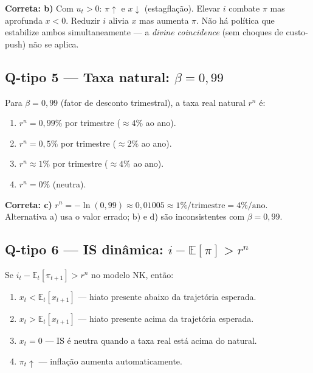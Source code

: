 \documentclass[12pt, a4paper]{article}
\newcommand{\E}{\mathbb{E}}
\begin{document}
\begin{resultbox}[title={Resposta Q-tipo 4: alternativa b)}]
\textbf{Correta: b)} Com $u_t > 0$: $\pi\uparrow$ e $x\downarrow$ (estagflação).
Elevar $i$ combate $\pi$ mas aprofunda $x<0$. Reduzir $i$ alivia $x$ mas aumenta $\pi$.
Não há política que estabilize ambos simultaneamente --- a \emph{divine coincidence}
(sem choques de custo-push) não se aplica.
\end{resultbox}

\bigskip

\subsection*{Q-tipo 5 --- Taxa natural: $\beta = 0{,}99$}

Para $\beta = 0{,}99$ (fator de desconto trimestral), a taxa real natural $r^n$ é:

\begin{enumerate}[label=\textbf{\alph*)}, leftmargin=2em, itemsep=4pt]
  \item $r^n = 0{,}99\%$ por trimestre ($\approx 4\%$ ao ano).
  \item $r^n = 0{,}5\%$ por trimestre ($\approx 2\%$ ao ano).
  \item $r^n \approx 1\%$ por trimestre ($\approx 4\%$ ao ano).
  \item $r^n = 0\%$ (neutra).
\end{enumerate}

\begin{resultbox}[title={Resposta Q-tipo 5: alternativa c)}]
\textbf{Correta: c)} $r^n = -\ln(0{,}99) \approx 0{,}01005 \approx 1\%/\text{trimestre}
= 4\%/\text{ano}$. Alternativa a) usa o valor errado; b) e d) são inconsistentes
com $\beta = 0{,}99$.
\end{resultbox}

\bigskip

\subsection*{Q-tipo 6 --- IS dinâmica: $i - \E[\pi] > r^n$}

Se $i_t - \E_t[\pi_{t+1}] > r^n$ no modelo NK, então:

\begin{enumerate}[label=\textbf{\alph*)}, leftmargin=2em, itemsep=4pt]
  \item $x_t < \E_t[x_{t+1}]$ --- hiato presente abaixo da trajetória esperada.
  \item $x_t > \E_t[x_{t+1}]$ --- hiato presente acima da trajetória esperada.
  \item $x_t = 0$ --- IS é neutra quando a taxa real está acima do natural.
  \item $\pi_t\uparrow$ --- inflação aumenta automaticamente.
\end{enumerate}
\end{document}
